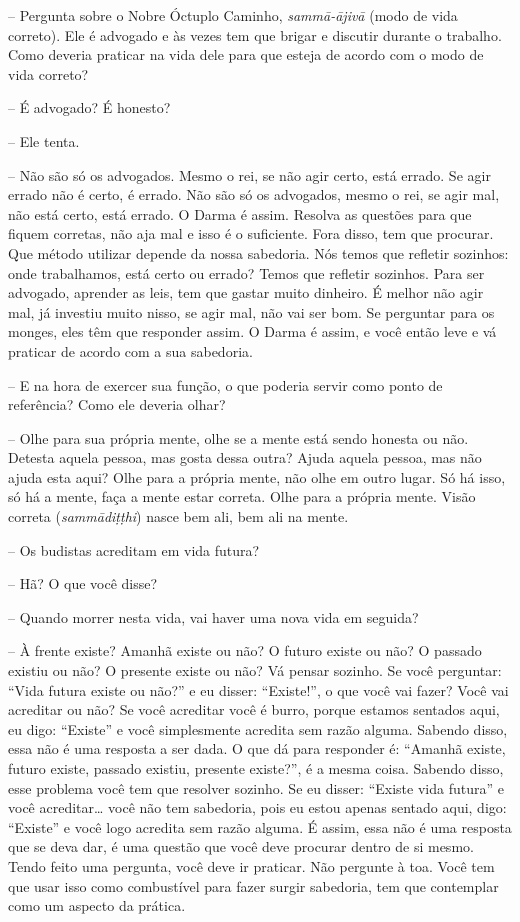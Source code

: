 -- Pergunta sobre o Nobre Óctuplo Caminho,
\emph{sammā-ājivā} (modo de vida correto). Ele é advogado e às
vezes tem que brigar e discutir durante o trabalho. Como deveria
praticar na vida dele para que esteja de acordo com o modo de vida
correto?

-- É advogado? É honesto?

-- Ele tenta.

-- Não são só os advogados. Mesmo o rei, se não agir certo, está
errado. Se agir errado não é certo, é errado. Não são só os advogados,
mesmo o rei, se agir mal, não está certo, está errado. O Darma é assim.
Resolva as questões para que fiquem corretas, não aja mal e isso é o
suficiente. Fora disso, tem que procurar. Que método utilizar depende
da nossa sabedoria. Nós temos que refletir sozinhos: onde trabalhamos,
está certo ou errado? Temos que refletir sozinhos. Para ser advogado,
aprender as leis, tem que gastar muito dinheiro. É melhor não agir mal,
já investiu muito nisso, se agir mal, não vai ser bom. Se perguntar
para os monges, eles têm que responder assim. O Darma é assim, e você
então leve e vá praticar de acordo com a sua sabedoria.

-- E na hora de exercer sua função, o que poderia servir como ponto
de referência? Como ele deveria olhar?

-- Olhe para sua própria mente, olhe se a mente está sendo honesta
ou não. Detesta aquela pessoa, mas gosta dessa outra? Ajuda aquela
pessoa, mas não ajuda esta aqui? Olhe para a própria mente, não olhe em
outro lugar. Só há isso, só há a mente, faça a mente estar correta.
Olhe para a própria mente. Visão correta (\emph{sammādiṭṭhi}) nasce
bem ali, bem ali na mente.

-- Os budistas acreditam em vida futura?

-- Hã? O que você disse? 

-- Quando morrer nesta vida, vai haver uma nova vida em seguida?

-- À frente existe? Amanhã existe ou não? O futuro existe ou não? O
passado existiu ou não? O presente existe ou não? Vá pensar sozinho. Se
você perguntar: “Vida futura existe ou não?” e eu disser: “Existe!”, o
que você vai fazer? Você vai acreditar ou não? Se você acreditar você é
burro, porque estamos sentados aqui, eu digo: “Existe” e você
simplesmente acredita sem razão alguma. Sabendo disso, essa não é uma
resposta a ser dada. O que dá para responder é: “Amanhã existe, futuro
existe, passado existiu, presente existe?”, é a mesma coisa. Sabendo
disso, esse problema você tem que resolver sozinho. Se eu disser:
“Existe vida futura” e você acreditar\ldots{} você não tem sabedoria, pois eu
estou apenas sentado aqui, digo: “Existe” e você logo acredita sem
razão alguma. É assim, essa não é uma resposta que se deva dar, é uma
questão que você deve procurar dentro de si mesmo. Tendo feito uma
pergunta, você deve ir praticar. Não pergunte à toa. Você tem que usar
isso como combustível para fazer surgir sabedoria, tem que contemplar
como um aspecto da prática.

